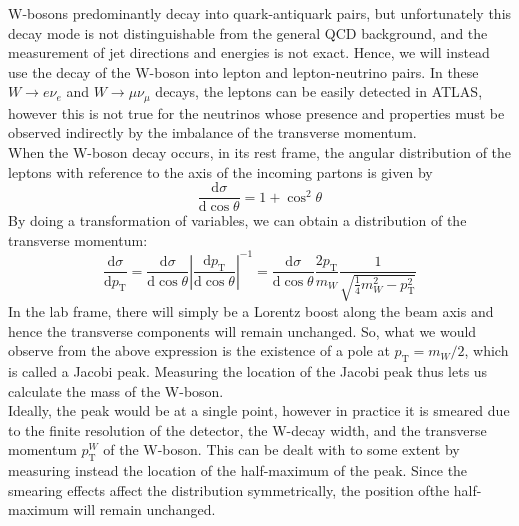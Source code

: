 \noindent W-bosons predominantly decay into quark-antiquark pairs, but unfortunately this decay mode is not distinguishable from the general QCD background, and the measurement of jet directions and energies is not exact. Hence, we will instead use the decay of the W-boson into lepton and lepton-neutrino pairs. In these $W \rightarrow e \nu_e$ and $W \rightarrow \mu \nu_{\mu}$ decays, the leptons can be easily detected in ATLAS, however this is not true for the neutrinos whose presence and properties must be observed indirectly by the imbalance of the transverse momentum.\\

\noindent When the W-boson decay occurs, in its rest frame, the angular distribution of the leptons with reference to the axis of the incoming partons is given by
$$\frac{\mathrm{d}\sigma}{\mathrm{d}\cos\theta} = 1 + \cos^2\theta$$
By doing a transformation of variables, we can obtain a distribution of the transverse momentum:
$$\frac{\mathrm{d}\sigma}{\mathrm{d}p_{\text{T}}} = \frac{\mathrm{d}\sigma}{\mathrm{d}\cos\theta} \left|\frac{\mathrm{d}p_{\text{T}}}{\mathrm{d}\cos\theta}\right|^{-1} = \frac{\mathrm{d}\sigma}{\mathrm{d}\cos\theta} \frac{2p_{\text{T}}}{m_W} \frac{1}{\sqrt{\frac{1}{4}m_W^2 - p_{\text{T}}^2}}$$
In the lab frame, there will simply be a Lorentz boost along the beam axis and hence the transverse components will remain unchanged. So, what we would observe from the above expression is the existence of a pole at $p_{\text{T}} = m_W/2$, which is called a Jacobi peak. Measuring the location of the Jacobi peak thus lets us calculate the mass of the W-boson.\\

\noindent Ideally, the peak would be at a single point, however in practice it is smeared due to the finite resolution of the detector, the W-decay width, and the transverse momentum $p_{\text{T}}^W$ of the W-boson. This can be dealt with to some extent by measuring instead the location of the half-maximum of the peak. Since the smearing effects affect the distribution symmetrically, the position ofthe half-maximum will remain unchanged.\\